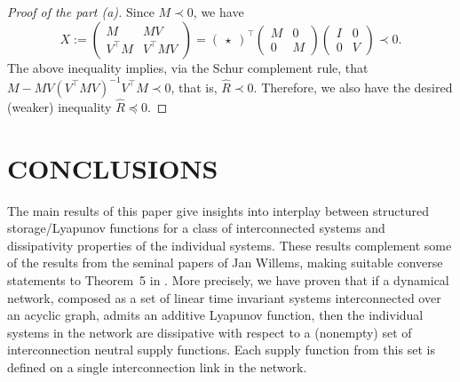 \documentclass[11pt,a4paper,oneside,DIV=12,headings=small]{scrartcl}
\theoremstyle{plain}
\begin{document}
\begin{proof}[Proof of the part (a)]
Since $M\prec 0$, we have
\begin{equation}
X:=\begin{pmatrix}M & MV \\ V^\top M & V^\top M V\end{pmatrix}
=\begin{pmatrix} \star \end{pmatrix}^\top
\begin{pmatrix} M & 0 \\ 0 & M \end{pmatrix}
\begin{pmatrix} I & 0 \\ 0 & V \end{pmatrix} \prec 0.
\end{equation}  
The above inequality implies, via the Schur complement rule, that $M-MV(V^\top M V)^{-1}V^\top M \prec 0$, that is, $\hat{R} \prec 0$. Therefore, we also have the desired (weaker) inequality $\hat{R} \preceq 0$.
\end{proof} 



\section{CONCLUSIONS}
\label{Sec7}
The main results of this paper give insights into interplay between structured storage/Lyapunov functions for a class of interconnected systems and dissipativity properties of the individual systems. These results complement some of the results from the seminal papers \cite{Willems_1, Willems_2} of Jan Willems, making suitable converse statements to Theorem~5 in \cite{Willems_1}. More precisely, we have proven that if a dynamical network, composed as a set of linear time invariant systems interconnected over an acyclic graph, admits an additive Lyapunov function, then the individual systems in the network are dissipative with respect to a (nonempty) set of interconnection neutral supply functions. Each supply function from this set is defined on a single interconnection link in the network. 
\end{document}

